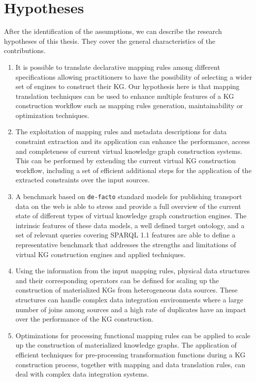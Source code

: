 \section{Hypotheses}
After the identification of the assumptions, we can describe the research hypotheses of this thesis. They cover the general characteristics of the contributions.
\begin{enumerate}[label=\textbf{H{\arabic*}}]
    \item It is possible to translate declarative mapping rules among different specifications allowing practitioners to have the possibility of selecting a wider set of engines to construct their KG. Our hypothesis here is that mapping translation techniques can be used to enhance multiple features of a KG construction workflow such as mapping rules generation, maintainability or optimization techniques.
    \item The exploitation of mapping rules and metadata descriptions for data constraint extraction and its application can enhance the performance, access and completeness of current virtual knowledge graph construction systems. This can be performed by extending the current virtual KG construction workflow, including a set of efficient additional steps for the application of the extracted constraints over the input sources. 
    \item A benchmark based on \texttt{de-facto} standard models for publishing transport data on the web is able to stress and provide a full overview of the current state of different types of virtual knowledge graph construction engines. The intrinsic features of these data models, a well defined target ontology, and a set of relevant queries covering SPARQL 1.1 features are able to define a representative benchmark that addresses the strengths and limitations of virtual KG construction engines and applied techniques.
    \item Using the information from the input mapping rules, physical data structures and their corresponding operators can be defined for scaling up the construction of materialized KGs from heterogeneous data sources. These structures can handle complex data integration environments where a large number of joins among sources and a high rate of duplicates have an impact over the performance of the KG construction. 
    \item Optimizations for processing functional mapping rules can be applied to scale up the construction of materialized knowledge graphs. The application of efficient techniques for pre-processing transformation functions during a KG construction process, together with mapping and data translation rules, can deal with complex data integration systems. 
    
\end{enumerate}


